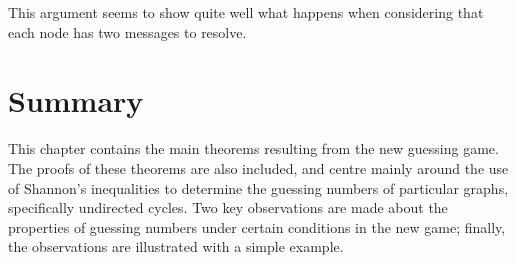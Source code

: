 This argument seems to show quite well what happens when considering that each node has two messages to resolve.

\section{Summary}

This chapter contains the main theorems resulting from the new guessing game. The proofs of these theorems are also included, and centre mainly around the use of Shannon's inequalities to determine the guessing numbers of particular graphs, specifically undirected cycles. Two key observations are made about the properties of guessing numbers under certain conditions in the new game; finally, the observations are illustrated with a simple example.